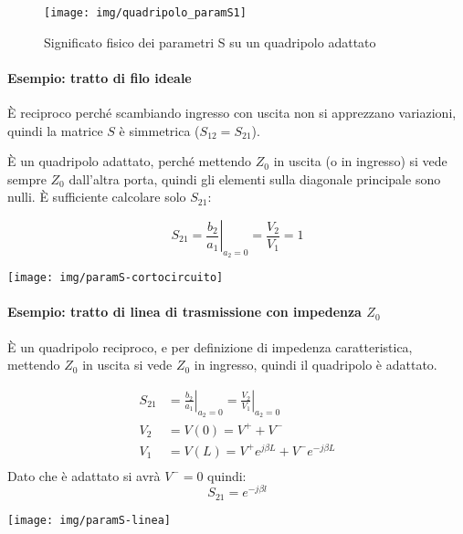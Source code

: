\begin{figure}[hbt]
	\centering
	\texttt{[image: img/quadripolo\_paramS1]}
	\caption{Significato fisico dei parametri S su un quadripolo adattato}
	\label{fig:lineaditrasmissione2}
\end{figure}

\vfill %

\begin{minipage}{.75\linewidth}
	\paragraph{Esempio: tratto di filo ideale}
	È reciproco perché scambiando ingresso con uscita non si apprezzano variazioni, quindi la matrice $S$ è simmetrica ($S_{12} = S_{21}$).
	
	È un quadripolo adattato, perché mettendo $Z_0$ in uscita (o in ingresso) si vede sempre $Z_0$ dall'altra porta, quindi gli elementi sulla diagonale principale sono nulli. È sufficiente calcolare solo $S_{21}$:
	
	$$S_{21} = \left. \frac{b_2}{a_1} \right|_{a_2=0}=
	\frac{V_2}{V_1} = 1$$
\end{minipage}
\begin{minipage}{.25\linewidth}
	\centering
	\texttt{[image: img/paramS-cortocircuito]}
\end{minipage}

\begin{minipage}{.65\linewidth}
	\paragraph{Esempio: tratto di linea di trasmissione con impedenza $Z_0$}
	
	È un quadripolo reciproco, e per definizione di impedenza caratteristica, mettendo $Z_0$ in uscita si vede $Z_0$ in ingresso, quindi il quadripolo è adattato.
	
	$$
	\begin{aligned}
	S_{21} &= \left. \frac{b_2}{a_1} \right|_{a_2=0} = \left.\frac{V_2}{V_1} \right|_{a_2 = 0}\\
	V_2 &= V(0) = V^+ + V^- \\
	V_1 &= V(L) = V^+ e^{j\beta L} + V^- e^{-j\beta L}\\
	\end{aligned}$$
	Dato che è adattato si avrà $V^- = 0$ quindi:
	\[S_{21} = e^{-j \beta l}\]
\end{minipage}
\begin{minipage}{.35\linewidth}
	\centering
	\texttt{[image: img/paramS-linea]}
\end{minipage}

